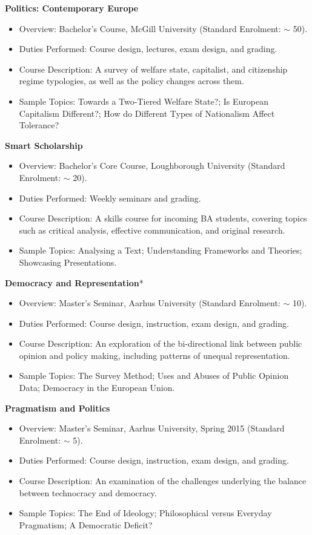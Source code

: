 \documentclass[11pt]{article}
\begin{document}
		  \textbf{Politics: Contemporary Europe}
	      \begin{itemize}[itemsep=0em, topsep=0em, partopsep=0em]
	      	\kern-\parskip\item Overview: Bachelor’s Course, McGill University (Standard Enrolment: $\sim$ 50).
	      	\item Duties Performed: Course design, lectures, exam design, and grading.
	      	\item Course Description: A survey of welfare state, capitalist, and citizenship regime typologies, as well as the policy changes across them.
	      	\item Sample Topics: Towards a Two-Tiered Welfare State?; Is European Capitalism Different?; How do Different Types of Nationalism Affect Tolerance? 
	      \end{itemize}
		  \textbf{Smart Scholarship}
	\begin{itemize}[itemsep=0em, topsep=0em, partopsep=0em]
		\kern-\parskip\item Overview: Bachelor’s Core Course, Loughborough University (Standard Enrolment: $\sim$ 20).
		\item Duties Performed: Weekly seminars and grading.
		\item Course Description: A skills course for incoming BA students, covering topics such as critical analysis, effective communication, and original research.
		\item Sample Topics: Analysing a Text; Understanding Frameworks and Theories; Showcasing Presentations.
	\end{itemize}
	\textbf{Democracy and Representation}*
	      \begin{itemize}[itemsep=0em, topsep=0em, partopsep=0em]
	      	\kern-\parskip\item Overview: Master’s Seminar, Aarhus University (Standard Enrolment: $\sim$ 10).
	      	\item Duties Performed: Course design, instruction, exam design, and grading.
	      	\item Course Description: An exploration of the bi-directional link between public opinion and policy making, including patterns of unequal representation.
	      	\item Sample Topics: The Survey Method; Uses and Abuses of Public Opinion Data; Democracy in the European Union.
	      \end{itemize}
	\textbf{Pragmatism and Politics}
	      \begin{itemize}[itemsep=0em, topsep=0em, partopsep=0em]
	      	\kern-\parskip\item Overview: Master’s Seminar, Aarhus University, Spring 2015 (Standard Enrolment: $\sim$ 5).
	      	\item Duties Performed: Course design, instruction, exam design, and grading.
	      	\item Course Description: An examination of the challenges underlying the balance between technocracy and democracy.
	      	\item Sample Topics: The End of Ideology; Philosophical versus Everyday Pragmatism; A Democratic Deficit?
	      \end{itemize}
\end{document}
